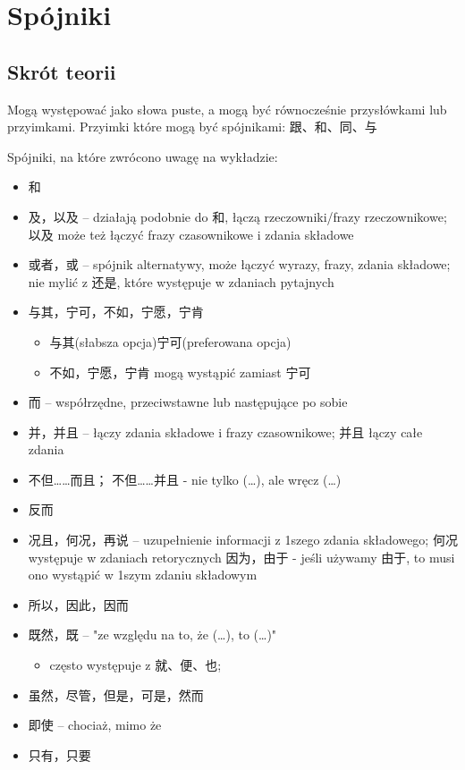 \chapter{Spójniki}
\section{Skrót teorii}
Mogą występować jako słowa puste, a mogą być równocześnie przysłówkami lub
przyimkami. Przyimki które mogą być spójnikami: 跟、和、同、与

Spójniki, na które zwrócono uwagę na wykładzie:
\begin{itemize}
\item 和
\item 及，以及 -- działają podobnie do 和, łączą rzeczowniki/frazy rzeczownikowe; 以及
  może też łączyć frazy czasownikowe i zdania składowe
\item 或者，或 -- spójnik alternatywy, może łączyć wyrazy, frazy, zdania składowe;
nie mylić z 还是, które występuje w zdaniach pytajnych 
\item 与其，宁可，不如，宁愿，宁肯
	\begin{itemize}
		\item 与其(słabsza opcja)宁可(preferowana opcja)
		\item 不如，宁愿，宁肯 mogą wystąpić zamiast 宁可
	\end{itemize}
\item 而 -- współrzędne, przeciwstawne lub następujące po sobie
\item 并，并且 -- łączy zdania składowe i frazy czasownikowe; 并且 łączy całe zdania
\item 不但……而且； 不但……并且 - nie tylko (…), ale wręcz (…)
\item 反而
\item 况且，何况，再说 -- uzupełnienie informacji z 1szego zdania składowego; 何况
występuje w zdaniach retorycznych 因为，由于 - jeśli używamy 由于, to musi ono wystąpić w 1szym zdaniu składowym 
\item 所以，因此，因而
\item 既然，既 -- "ze względu na to, że (…), to (…)" 
	\begin{itemize}
	  \item często występuje z 就、便、也;
	\end{itemize}
\item 虽然，尽管，但是，可是，然而
\item 即使 -- chociaż, mimo że
\item 只有，只要

\end{itemize}
